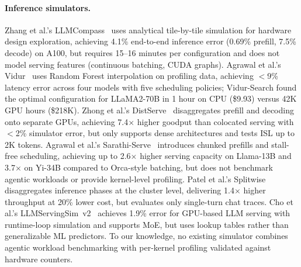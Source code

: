 \paragraph{Inference simulators.}
Zhang et al.'s LLMCompass~\citep{llmcompass} uses analytical tile-by-tile simulation for hardware design exploration, achieving 4.1\% end-to-end inference error (0.69\% prefill, 7.5\% decode) on A100, but requires 15--16 minutes per configuration and does not model serving features (continuous batching, CUDA graphs).
Agrawal et al.'s Vidur~\citep{vidur} uses Random Forest interpolation on profiling data, achieving ${<}$9\% latency error across four models with five scheduling policies; Vidur-Search found the optimal configuration for LLaMA2-70B in 1 hour on CPU (\$9.93) versus 42K GPU hours (\$218K).
Zhong et al.'s DistServe~\citep{distserve} disaggregates prefill and decoding onto separate GPUs, achieving 7.4$\times$ higher goodput than colocated serving with ${<}$2\% simulator error, but only supports dense architectures and tests ISL up to 2K tokens.
Agrawal et al.'s Sarathi-Serve~\citep{sarathi} introduces chunked prefills and stall-free scheduling, achieving up to 2.6$\times$ higher serving capacity on Llama-13B and 3.7$\times$ on Yi-34B compared to Orca-style batching, but does not benchmark agentic workloads or provide kernel-level profiling.
Patel et al.'s Splitwise~\citep{splitwise} disaggregates inference phases at the cluster level, delivering 1.4$\times$ higher throughput at 20\% lower cost, but evaluates only single-turn chat traces.
Cho et al.'s LLMServingSim~v2~\citep{llmservingsim} achieves 1.9\% error for GPU-based LLM serving with runtime-loop simulation and supports MoE, but uses lookup tables rather than generalizable ML predictors.
To our knowledge, no existing simulator combines agentic workload benchmarking with per-kernel profiling validated against hardware counters.

